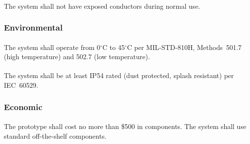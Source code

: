 \paragraph{}
The system shall not have exposed conductors during normal use.

\subsubsection{Environmental}

\paragraph{} \label{temp}
The system shall operate from 0$^{\circ}$C to 45$^{\circ}$C per MIL-STD-810H, Methods~501.7 (high temperature) and 502.7 (low temperature).

\paragraph{} \label{ip}
The system shall be at least IP54 rated (dust protected, splash resistant) per IEC~60529.

\subsubsection{Economic}

\paragraph{} \label{cost}
The prototype shall cost no more than \$500 in components.  The system shall use standard off-the-shelf components.
